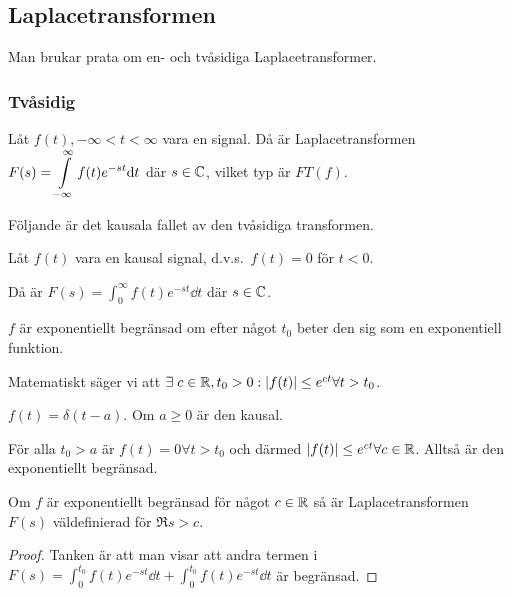 \documentclass[a4paper]{article}
\begin{document}
\providecommand\fname{}
\renewcommand\fname{19-09-26}

\subsection{Laplacetransformen}
Man brukar prata om en- och tvåsidiga Laplacetransformer. 
\subsubsection{Tvåsidig}
\begin{defn}
    Låt \(
        f(t), -\infty < t < \infty
    \) vara en signal. Då är Laplacetransformen \(
        F(s) = \displaystyle\int\limits_{-\infty}^{\infty} f(t)e^{-st}\dd t
    \) där \(
        s \in \mathbb{C}
    \), vilket typ är \(
        FT(f)
    \).
\end{defn}
    
Följande är det kausala fallet av den tvåsidiga transformen.
\begin{defn}
    Låt \(
        f(t)
    \) vara en kausal signal, d.v.s.\ \(
        f(t) = 0
    \) för \(
        t < 0
    \).

    Då är \(
        F(s) = \int_0^\infty f(t) e^{-st}\dd t
    \) där \(
        s \in \mathbb{C}
    \).
\end{defn}

\begin{defn}
    \(
        f
    \) är exponentiellt begränsad om efter något \(
        t_0
    \) beter den sig som en exponentiell funktion.

    Matematiskt säger vi att \(
        \exists \; c \in \mathbb{R}, t_0 > 0 : \abs{f(t)} \leq e^{ct} \forall t > t_0
    \).
\end{defn}

\begin{ex}
    \(
        f(t) = \delta(t-a)
    \). Om \(
        a \geq 0
    \) är den kausal.

    För alla \(
        t_0 > a
    \) är \(
        f(t) = 0 \forall t > t_0
    \) och därmed \(
        \abs{f(t)} \leq e^{ct} \forall c \in \mathbb{R}
    \). Alltså är den exponentiellt begränsad.
\end{ex}

\begin{påst}
    Om \(
        f 
    \) är exponentiellt begränsad för något \(
        c \in \mathbb{R}
    \) så är Laplacetransformen \(
        F(s)
    \) väldefinierad för \(
        \Re{s} > c
    \).

    \begin{proof}
        Tanken är att man visar att andra termen i \(
            F(s) = \int_0^{t_0} f(t) e^{-st} \dd t + \int_0^{t_0} f(t) e^{-st}\dd t
        \) är begränsad.
    \end{proof}
\end{påst}
\end{document}
